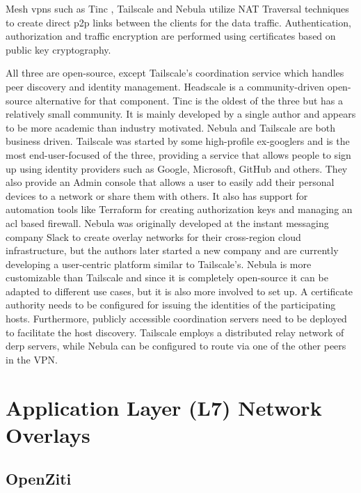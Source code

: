 Mesh \glspl{vpn} such as Tinc \autocite{tincDocs}, Tailscale
\autocite{tailscaleDocs} and Nebula \autocite{nebulaDocs} utilize NAT
Traversal techniques to create direct \gls{p2p} links between the
clients for the data traffic. Authentication, authorization and traffic
encryption are performed using certificates based on public key
cryptography.

All three are open-source, except Tailscale's coordination service which
handles peer discovery and identity management. Headscale
\autocite{fontJuanfontHeadscale2022} is a community-driven open-source
alternative for that component. Tinc is the oldest of the three but has
a relatively small community. It is mainly developed by a single author
and appears to be more academic than industry motivated. Nebula and
Tailscale are both business driven. Tailscale was started by some
high-profile ex-googlers and is the most end-user-focused of the three,
providing a service that allows people to sign up using identity
providers such as Google, Microsoft, GitHub and others. They also
provide an Admin console that allows a user to easily add their personal
devices to a network or share them with others. It also has support for
automation tools like Terraform for creating authorization keys and
managing an \gls{acl} based firewall. Nebula was originally developed at
the instant messaging company Slack to create overlay networks for their
cross-region cloud infrastructure, but the authors later started a new
company and are currently developing a user-centric platform similar to
Tailscale's. Nebula is more customizable than Tailscale and since it is
completely open-source it can be adapted to different use cases, but it
is also more involved to set up. A certificate authority needs to be
configured for issuing the identities of the participating hosts.
Furthermore, publicly accessible coordination servers need to be
deployed to facilitate the host discovery. Tailscale employs a
distributed relay network of \gls{derp} servers, while Nebula can be
configured to route via one of the other peers in the VPN.

\hypertarget{application-layer-l7-network-overlays}{%
\section{Application Layer (L7) Network
Overlays}\label{application-layer-l7-network-overlays}}

\hypertarget{openziti}{%
\subsection{OpenZiti}\label{openziti}}

